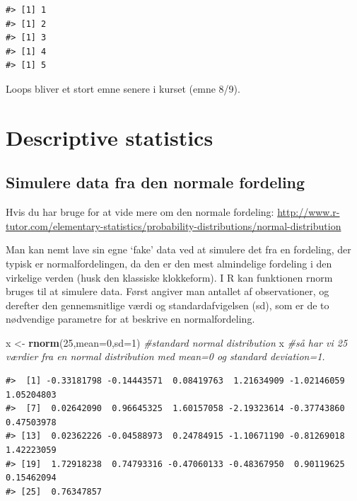 \documentclass[
]{book}
\newenvironment{Shaded}{\begin{snugshade}}{\end{snugshade}}
\newcommand{\AttributeTok}[1]{\textcolor[rgb]{0.27,0.27,0.27}{#1}}
\newcommand{\CommentTok}[1]{\textcolor[rgb]{0.37,0.37,0.37}{\textit{#1}}}
\newcommand{\DecValTok}[1]{\textcolor[rgb]{0.06,0.06,0.06}{#1}}
\newcommand{\FunctionTok}[1]{\textcolor[rgb]{0.27,0.27,0.27}{\textbf{#1}}}
\newcommand{\NormalTok}[1]{#1}
\newcommand{\OtherTok}[1]{\textcolor[rgb]{0.37,0.37,0.37}{#1}}
\begin{document}
\begin{verbatim}
#> [1] 1
#> [1] 2
#> [1] 3
#> [1] 4
#> [1] 5
\end{verbatim}

Loops bliver et stort emne senere i kurset (emne 8/9).

\section{Descriptive statistics}\label{descriptive-statistics}

\subsection{Simulere data fra den normale fordeling}\label{simulere-data-fra-den-normale-fordeling}

Hvis du har bruge for at vide mere om den normale fordeling: \url{http://www.r-tutor.com/elementary-statistics/probability-distributions/normal-distribution}

Man kan nemt lave sin egne `fake' data ved at simulere det fra en fordeling, der typisk er normalfordelingen, da den er den mest almindelige fordeling i den virkelige verden (husk den klassiske klokkeform). I R kan funktionen rnorm bruges til at simulere data. Først angiver man antallet af observationer, og derefter den gennemsnitlige værdi og standardafvigelsen (sd), som er de to nødvendige parametre for at beskrive en normalfordeling.

\begin{Shaded}
\begin{Highlighting}[]
\NormalTok{x }\OtherTok{\textless{}{-}} \FunctionTok{rnorm}\NormalTok{(}\DecValTok{25}\NormalTok{,}\AttributeTok{mean=}\DecValTok{0}\NormalTok{,}\AttributeTok{sd=}\DecValTok{1}\NormalTok{) }\CommentTok{\#standard normal distribution}
\NormalTok{x }\CommentTok{\#så har vi 25 værdier fra en normal distribution med mean=0 og standard deviation=1.}
\end{Highlighting}
\end{Shaded}

\begin{verbatim}
#>  [1] -0.33181798 -0.14443571  0.08419763  1.21634909 -1.02146059  1.05204803
#>  [7]  0.02642090  0.96645325  1.60157058 -2.19323614 -0.37743860  0.47503978
#> [13]  0.02362226 -0.04588973  0.24784915 -1.10671190 -0.81269018  1.42223059
#> [19]  1.72918238  0.74793316 -0.47060133 -0.48367950  0.90119625  0.15462094
#> [25]  0.76347857
\end{verbatim}
\end{document}
